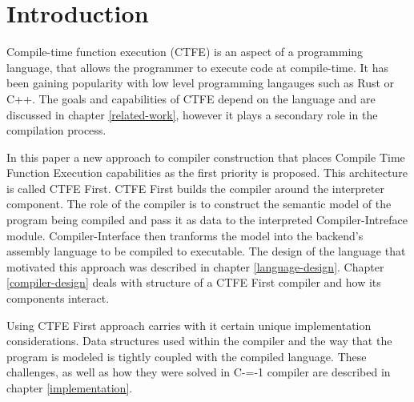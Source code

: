\section{Introduction}


Compile-time function execution (CTFE) is an aspect of a programming language, that allows the programmer to execute code at compile-time.
It has been gaining popularity with low level programming langauges such as Rust or C++.
The goals and capabilities of CTFE depend on the language and are discussed in chapter \ref{related-work}, however it plays a secondary role in the compilation process.

In this paper a new approach to compiler construction that places Compile Time Function Execution capabilities as the first priority is proposed.
This architecture is called CTFE First.
CTFE First builds the compiler around the interpreter component.
The role of the compiler is to construct the semantic model of the program being compiled and pass it as data to the interpreted Compiler-Intreface module.
Compiler-Interface then tranforms the model into the backend's assembly language to be compiled to executable.
The design of the language that motivated this approach was described in chapter \ref{language-design}.
Chapter \ref{compiler-design} deals with structure of a CTFE First compiler and how its components interact.

Using CTFE First approach carries with it certain unique implementation considerations.
Data structures used within the compiler and the way that the program is modeled is tightly coupled with the compiled language.
These challenges, as well as how they were solved in C-=-1 compiler are described in chapter \ref{implementation}.
